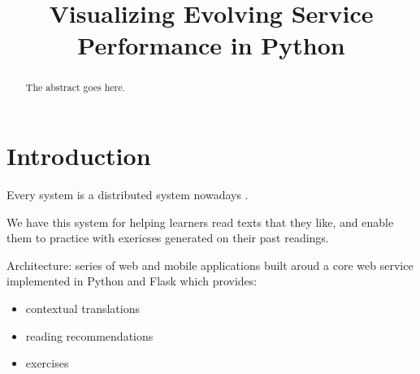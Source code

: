 \documentclass[conference]{IEEEtran}
\begin{document}
%
\title{Visualizing Evolving Service Performance in Python }


\author{
\and
{}
\and
{}
}



\maketitle

\begin{abstract}
The abstract goes here.
\end{abstract}


\IEEEpeerreviewmaketitle



\section{Introduction}
Every system is a distributed system nowadays \cite{}.

\vspace {5cm}

 

We have this system for helping learners read texts that they like, and enable them to practice with exericses generated on their past readings.

Architecture: series of web and mobile applications built aroud a core web service implemented in Python and Flask which provides: 
\begin{itemize}
  \item contextual translations 
  \item reading recommendations
  \item exercises
\end{itemize}
\end{document}
